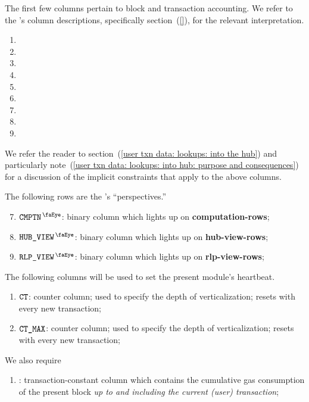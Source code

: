 The first few columns pertain to block and transaction accounting.
We refer to the \hubMod{}'s column descriptions,
specifically section~(\ref{}),
for the relevant interpretation.
\begin{multicols}{3}
	\begin{enumerate}
		\item \blockNumber
		\item[\vspace{\fill}]
		\item[\vspace{\fill}]
		\item \totalTransactionNumber
		\item \userTransactionNumber
		\item[\vspace{\fill}]
		\item \sysi
		\item \user
		\item \sysf
	\end{enumerate}
\end{multicols}
\noindent We refer the reader to
section~(\ref{user txn data: lookups: into the hub}) and particularly
note~(\ref{user txn data: lookups: into hub: purpose and consequences})
for a discussion of the implicit constraints that apply to the above columns.

The following rows are the \userTxnDataMod{}'s ``perspectives.''
\begin{enumerate}\setcounter{enumi}{6}
	\item
		$\isUserTxnComputation$:
		binary column which lights up on \textbf{computation-rows};
	\item
		$\isUserTxnHubView$:
		binary column which lights up on \textbf{hub-view-rows};
	\item
		$\isUserTxnRlpView$:
		binary column which lights up on \textbf{rlp-view-rows};
\end{enumerate}
The following columns will be used to set the present module's heartbeat.
\begin{enumerate}[resume]
	\item $\texttt{CT}$:
		counter column;
		used to specify the depth of verticalization;
		resets with every new transaction; 
	\item $\texttt{CT\_MAX}$:
		counter column;
		used to specify the depth of verticalization;
		resets with every new transaction; 
\end{enumerate}
We also require
\begin{enumerate}[resume]
	\item \cumulativeConsumedGas:
		transaction-constant column which contains the cumulative gas consumption of the present block
		\emph{up to and including the current (user) transaction};
\end{enumerate}
